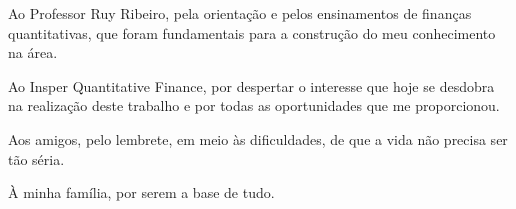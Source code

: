 \begin{agradecimentos}

Ao Professor Ruy Ribeiro, pela orientação e pelos ensinamentos de finanças quantitativas, que foram fundamentais para a construção do meu conhecimento na área. \

Ao Insper Quantitative Finance, por despertar o interesse que hoje se desdobra na realização deste trabalho e por todas as oportunidades que me proporcionou. \

Aos amigos, pelo lembrete, em meio às dificuldades, de que a vida não precisa ser tão séria. \

À minha família, por serem a base de tudo.

\end{agradecimentos}